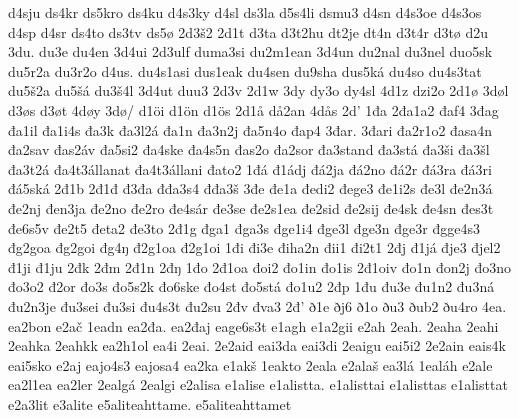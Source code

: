 {    d4sju
    ds4kr
    ds5kro
    ds4ku
    d4s3ky
    d4sl
    ds3la
    d5s4li
    dsmu3
    d4sn
    d4s3oe
    d4s3os
    d4sp
    d4sr
    ds4to
    ds3tv
    ds5ø
    2d3š2
    2d1t
    d3ta
    d3t2hu
    dt2je
    dt4n
    d3t4r
    d3tø
    d2u
    3du.
    du3e
    du4en
    3d4ui
    2d3ulf
    duma3si
    du2m1ean
    3d4un
    du2nal
    du3nel
    duo5sk
    du5r2a
    du3r2o
    d4us.
    du4s1asi
    dus1eak
    du4sen
    du9sha
    dus5ká
    du4so
    du4s3tat
    du5š2a
    du5šá
    du3š4l
    3d4ut
    duu3
    2d3v
    2d1w
    3dy
    dy3o
    dy4sl
    4d1z
    dzi2o
    2d1ø
    3døl
    d3øs
    d3øt
    4døy
    3dø/
    d1öi
    d1ön
    d1ös
    2d1å
    då2an
    4dås
    2d'
    1đa
    2đa1a2
    đaf4
    3đag
    đa1il
    đa1i4s
    đa3k
    đa3l2á
    đa1n
    đa3n2j
    đa5n4o
    đap4
    3đar.
    3đari
    đa2r1o2
    đasa4n
    đa2sav
    đas2áv
    đa5si2
    đa4ske
    đa4s5n
    đas2o
    đa2sor
    đa3stand
    đa3stá
    đa3ši
    đa3šl
    đa3t2á
    đa4t3állanat
    đa4t3állani
    đato2
    1đá
    đ1ádj
    đá2ja
    đá2no
    đá2r
    đá3ra
    đá3ri
    đá5ská
    2đ1b
    2đ1đ
    đ3đa
    đđa3s4
    đđa3š
    3đe
    đe1a
    đedi2
    đege3
    đe1i2s
    đe3l
    đe2n3á
    đe2nj
    đen3ja
    đe2no
    đe2ro
    đe4sár
    đe3se
    đe2s1ea
    đe2sid
    đe2sij
    đe4sk
    đe4sn
    đes3t
    đe6s5v
    đe2t5
    đeta2
    đe3to
    2đ1g
    đga1
    đga3s
    đge1i4
    đge3l
    đge3n
    đge3r
    đgge4s3
    đg2goa
    đg2goi
    đg4ŋ
    đ2g1oa
    đ2g1oi
    1đi
    đi3e
    điha2n
    đii1
    đi2t1
    2đj
    đ1já
    đje3
    đjel2
    đ1ji
    đ1ju
    2đk
    2đm
    2đ1n
    2đŋ
    1đo
    2đ1oa
    đoi2
    đo1in
    đo1is
    2đ1oiv
    đo1n
    đon2j
    đo3no
    đo3o2
    đ2or
    đo3s
    đo5s2k
    đo6ske
    đo4st
    đo5stá
    đo1u2
    2đp
    1đu
    đu3e
    đu1n2
    đu3ná
    đu2n3je
    đu3sei
    đu3si
    đu4s3t
    đu2su
    2đv
    đva3
    2đ'
    ð1e
    ðj6
    ð1o
    ðu3
    ðub2
    ðu4ro
    4ea.
    ea2bon
    e2ač
    1eadn
    ea2đa.
    ea2đaj
    eage6s3t
    e1agh
    e1a2gii
    e2ah
    2eah.
    2eaha
    2eahi
    2eahka
    2eahkk
    ea2h1ol
    ea4i
    2eai.
    2e2aid
    eai3da
    eai3di
    2eaigu
    eai5i2
    2e2ain
    eais4k
    eai5sko
    e2aj
    eajo4s3
    eajosa4
    ea2ka
    e1akš
    1eakto
    2eala
    e2alaš
    ea3lá
    1ealáh
    e2ale
    ea2l1ea
    ea2ler
    2ealgá
    2ealgi
    e2alisa
    e1alise
    e1alistta.
    e1alisttai
    e1alisttas
    e1alisttat
    e2a3lit
    e3alite
    e5aliteahttame.
    e5aliteahttamet
}
